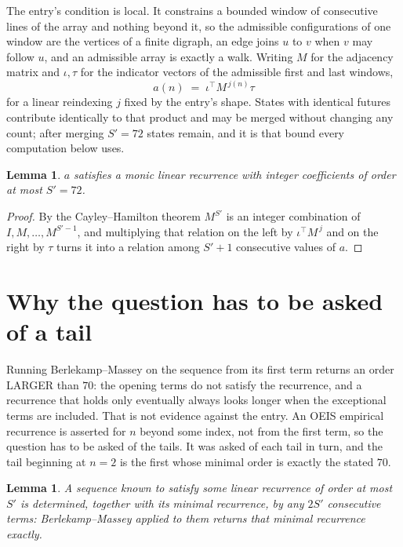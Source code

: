\documentclass[11pt,a4paper]{article}
\theoremstyle{plain}
\newtheorem{lemma}[theorem]{Lemma}
\theoremstyle{definition}
\begin{document}
The entry's condition is local. It constrains a bounded window of consecutive lines of the
array and nothing beyond it, so the admissible configurations of one window are the vertices of
a finite digraph, an edge joins $u$ to $v$ when $v$ may follow $u$, and an admissible array is
exactly a walk. Writing $M$ for the adjacency matrix and $\iota,\tau$ for the indicator vectors
of the admissible first and last windows,
\[
a(n)\;=\;\iota^{\!\top}M^{\,j(n)}\tau
\]
for a linear reindexing $j$ fixed by the entry's shape. States with identical futures
contribute identically to that product and may be merged without changing any count; after
merging $S'=72$ states remain, and it is that bound every computation below uses.

\begin{lemma}\label{lem:cf}
$a$ satisfies a monic linear recurrence with integer coefficients of order at most $S'=72$.
\end{lemma}

\begin{proof}
By the Cayley--Hamilton theorem $M^{S'}$ is an integer combination of $I,M,\dots,M^{S'-1}$,
and multiplying that relation on the left by $\iota^{\!\top}M^{\,j}$ and on the right by
$\tau$ turns it into a relation among $S'+1$ consecutive values of $a$.
\end{proof}

\section{Why the question has to be asked of a tail}

Running Berlekamp--Massey on the sequence from its first term returns an order LARGER than $70$: the opening terms do not satisfy the recurrence, and a recurrence that holds only eventually always looks longer when the exceptional terms are included. That is not evidence against the entry. An OEIS empirical recurrence is asserted for $n$ beyond some index, not from the first term, so the question has to be asked of the tails. It was asked of each tail in turn, and the tail beginning at $n=2$ is the first whose minimal order is exactly the stated $70$.

\begin{lemma}\label{lem:bm}
A sequence known to satisfy some linear recurrence of order at most $S'$ is determined,
together with its minimal recurrence, by any $2S'$ consecutive terms: Berlekamp--Massey applied
to them returns that minimal recurrence exactly.
\end{lemma}
\end{document}
